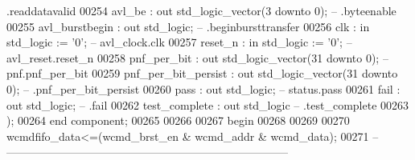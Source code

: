\begin{DoxyCode}
{       .readdatavalid}
00254         avl\_be              : \textcolor{keywordflow}{out} \textcolor{comment}{std\_logic\_vector}(\textcolor{vhdllogic}{}\textcolor{vhdllogic}{3} \textcolor{keywordflow}{downto} \textcolor{vhdllogic}{}\textcolor{vhdllogic}{0});                     \textcolor{keyword}{--          .byteenable}
00255         avl\_burstbegin      : \textcolor{keywordflow}{out} \textcolor{comment}{std\_logic};                                        \textcolor{keyword}{--         
       .beginbursttransfer}
00256         clk                 : \textcolor{keywordflow}{in}  \textcolor{comment}{std\_logic}                     := '\textcolor{vhdllogic}{}\textcolor{vhdllogic}{0}';             \textcolor{keyword}{-- avl\_clock.clk}
00257         reset\_n             : \textcolor{keywordflow}{in}  \textcolor{comment}{std\_logic}                     := '\textcolor{vhdllogic}{}\textcolor{vhdllogic}{0}';             \textcolor{keyword}{-- avl\_reset.reset\_n}
00258         pnf\_per\_bit         : \textcolor{keywordflow}{out} \textcolor{comment}{std\_logic\_vector}(\textcolor{vhdllogic}{}\textcolor{vhdllogic}{31} \textcolor{keywordflow}{downto} \textcolor{vhdllogic}{}\textcolor{vhdllogic}{0});                    \textcolor{keyword}{--      
       pnf.pnf\_per\_bit}
00259         pnf\_per\_bit\_persist : \textcolor{keywordflow}{out} \textcolor{comment}{std\_logic\_vector}(\textcolor{vhdllogic}{}\textcolor{vhdllogic}{31} \textcolor{keywordflow}{downto} \textcolor{vhdllogic}{}\textcolor{vhdllogic}{0});                    \textcolor{keyword}{--         
       .pnf\_per\_bit\_persist}
00260         pass                : \textcolor{keywordflow}{out} \textcolor{comment}{std\_logic};                                        \textcolor{keyword}{--    status.pass}
00261         fail                : \textcolor{keywordflow}{out} \textcolor{comment}{std\_logic};                                        \textcolor{keyword}{--          .fail}
00262         test\_complete       : \textcolor{keywordflow}{out} \textcolor{comment}{std\_logic}\textcolor{keyword}{                                         --         
       .test\_complete}
00263     );
00264 \textcolor{keywordflow}{end} \textcolor{keywordflow}{component};
00265 
00266   
00267 \textcolor{vhdlkeyword}{begin}
00268 
00269 
00270 \textcolor{vhdlchar}{wcmdfifo_data}\textcolor{vhdlchar}{<=}\textcolor{vhdlchar}{(}\textcolor{vhdlchar}{wcmd_brst_en} \textcolor{vhdlchar}{&} \textcolor{vhdlchar}{wcmd_addr} \textcolor{vhdlchar}{&} \textcolor{vhdlchar}{wcmd_data}\textcolor{vhdlchar}{)};
00271 \textcolor{keyword}{-- ---------------------------------------------------------------------------}

\end{DoxyCode}

